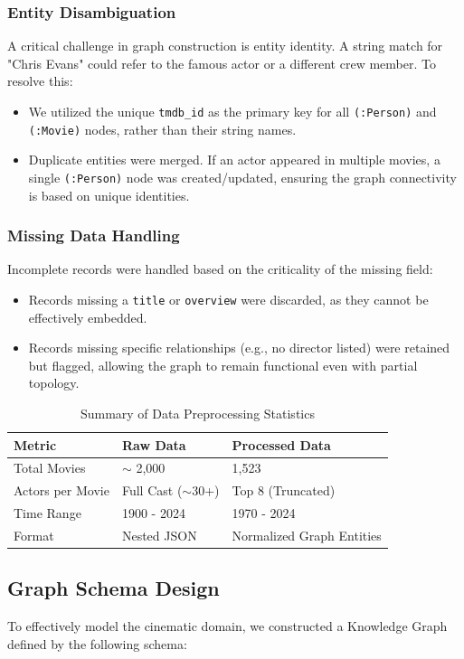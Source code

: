 \documentclass[a4paper, 12pt]{extreport}
\begin{document}
\subsubsection{Entity Disambiguation}
A critical challenge in graph construction is entity identity. A string match for "Chris Evans" could refer to the famous actor or a different crew member. To resolve this:
\begin{itemize}
    \item[] We utilized the unique \texttt{tmdb\_id} as the primary key for all \texttt{(:Person)} and \texttt{(:Movie)} nodes, rather than their string names.
    \item[] Duplicate entities were merged. If an actor appeared in multiple movies, a single \texttt{(:Person)} node was created/updated, ensuring the graph connectivity is based on unique identities.
\end{itemize}

\subsubsection{Missing Data Handling}
Incomplete records were handled based on the criticality of the missing field:
\begin{itemize}
    \item[] Records missing a \texttt{title} or \texttt{overview} were discarded, as they cannot be effectively embedded.
    \item[] Records missing specific relationships (e.g., no director listed) were retained but flagged, allowing the graph to remain functional even with partial topology.
\end{itemize}

\begin{table}[h]
\centering
\caption{Summary of Data Preprocessing Statistics}
\label{tab:preprocessing_stats}
\begin{tabular}{|l|l|l|}
\hline
\textbf{Metric} & \textbf{Raw Data} & \textbf{Processed Data} \\ \hline
Total Movies & $\sim$ 2,000 & 1,523 \\ \hline
Actors per Movie & Full Cast ($\sim$30+) & Top 8 (Truncated) \\ \hline
Time Range & 1900 - 2024 & 1970 - 2024 \\ \hline
Format & Nested JSON & Normalized Graph Entities \\ \hline
\end{tabular}
\end{table}
\subsection{Graph Schema Design}
To effectively model the cinematic domain, we constructed a Knowledge Graph defined by the following schema:
\end{document}
